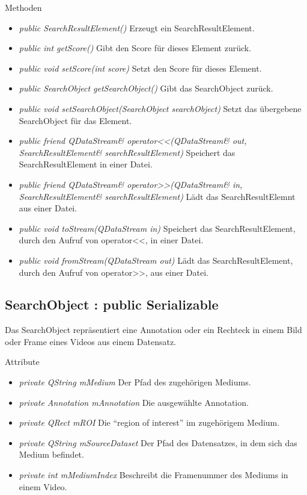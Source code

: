 Methoden
\begin{itemize}
\item \textit{public SearchResultElement()} Erzeugt ein SearchResultElement.
\item \textit{public int getScore()} Gibt den Score für dieses Element zurück.
\item \textit{public void setScore(int score)} Setzt den Score für dieses Element.
\item \textit{public SearchObject getSearchObject()} Gibt das SearchObject zurück.
\item \textit{public void setSearchObject(SearchObject searchObject)} Setzt das übergebene SearchObject für das Element.
\item \textit{public friend QDataStream\& operator<<(QDataStream\& out, SearchResultElement\& searchResultElement)} Speichert das SearchResultElement in einer Datei.
\item \textit{public friend QDataStream\& operator>>(QDataStream\& in, SearchResultElement\& searchResultElement)} Lädt das SearchResultElemnt aus einer Datei.
\item \textit{public void toStream(QDataStream in)} Speichert das SearchResultElement, durch den Aufruf von operator<<, in einer Datei.
\item \textit{public void fromStream(QDataStream out)} Lädt das SearchResultElement, durch den Aufruf von operator>>, aus einer Datei.
\end{itemize}

\subsection*{SearchObject : public Serializable}
Das SearchObject repräsentiert eine Annotation oder ein Rechteck in einem Bild oder Frame eines Videos aus einem Datensatz.

Attribute
\begin{itemize}
\item\textit{private QString mMedium} Der Pfad des zugehörigen Mediums.
\item\textit{private Annotation mAnnotation} Die ausgewählte Annotation.
\item\textit{private QRect mROI} Die \enquote{region of interest} im zugehörigem Medium.
\item\textit{private QString mSourceDataset} Der Pfad des Datensatzes, in dem sich das Medium befindet.
\item\textit{private int mMediumIndex} Beschreibt die Framenummer des Mediums in einem Video.
\end{itemize}

